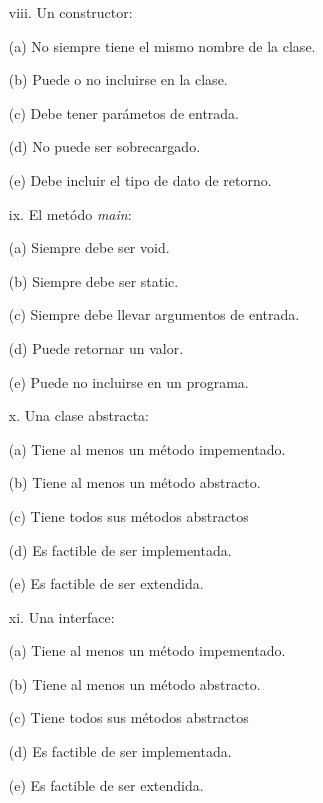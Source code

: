 \documentclass[10pt]{article}
\begin{document}
{\begin{enumerate}
\begin{multicols}{2}
    \begin{enumerate}[label=(\alph*)]
        \item[viii.] Un constructor: 
        \item[(a)] No siempre tiene el mismo nombre de la clase.
        \item[(b)] Puede o no incluirse en la clase.
        \item[(c)] Debe tener par\'ametos de entrada.
        \item[(d)] No puede ser sobrecargado.
        \item[(e)] Debe incluir el tipo de dato de retorno.
    \end{enumerate}

    \begin{enumerate}[label=(\alph*)]
        \item[ix.] El met\'odo \emph{main}:
        \item[(a)] Siempre debe ser void.
        \item[(b)] Siempre debe ser static.
        \item[(c)] Siempre debe llevar argumentos de entrada.
        \item[(d)] Puede retornar un valor.
        \item[(e)] Puede no incluirse en un programa.
    \end{enumerate}

	\begin{enumerate}[label=(\alph*)]
        \item[x.] Una clase abstracta:
        \item[(a)] Tiene al menos un m\'etodo impementado.
        \item[(b)] Tiene al menos un m\'etodo abstracto.
        \item[(c)] Tiene todos sus m\'etodos abstractos
        \item[(d)] Es factible de ser implementada.
        \item[(e)] Es factible de ser extendida.
    \end{enumerate}

    \begin{enumerate}[label=(\alph*)]
        \item[xi.] Una interface:
        \item[(a)] Tiene al menos un m\'etodo impementado.
        \item[(b)] Tiene al menos un m\'etodo abstracto.
        \item[(c)] Tiene todos sus m\'etodos abstractos
        \item[(d)] Es factible de ser implementada.
        \item[(e)] Es factible de ser extendida.
    \end{enumerate}


\end{multicols}
\end{enumerate}}
\end{document}
